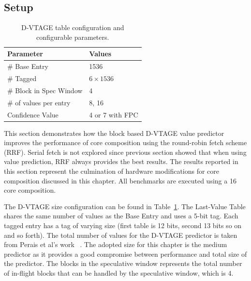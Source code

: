 \subsection{Setup}

\begin{table}[t]
\small
\centering
\begin{tabular}{p{5.2cm} p{3cm}}
\toprule
\textbf{Parameter} & \textbf{Values} \\ \midrule
\# Base Entry & 1536\\
\# Tagged & $6\times1536$\\
\# Block in Spec Window & 4 \\ \hline \midrule
\# of values per entry & 8, 16\\
Confidence Value & 4 or 7 with FPC \\ \bottomrule
\end{tabular}
  \caption{D-VTAGE table configuration and configurable parameters.}\label{tab:vtage-conf}
\vspace{1em}
\end{table}

This section demonstrates how the block based D-VTAGE value predictor improves the performance of core composition using the round-robin fetch scheme (RRF).
Serial fetch is not explored since previous section showed that when using value prediction, RRF always provides the best results.
The results reported in this section represent the culmination of hardware modifications for core composition discussed in this chapter.
All benchmarks are executed using a 16 core composition.

The D-VTAGE size configuration can be found in Table~\ref{tab:vtage-conf}.
The Last-Value Table shares the same number of values as the Base Entry and uses a 5-bit tag.
Each tagged entry has a tag of varying size (first table is 12 bits, second 13 bits so on and so forth).
The total number of values for the D-VTAGE predictor is taken from Perais et al's work ~\cite{peraisBeBop2015}.
The adopted size for this chapter is the medium predictor as it provides a good compromise between performance and total size of the predictor.
The blocks in the speculative window represents the total number of in-flight blocks that can be handled by the speculative window, which is 4.

